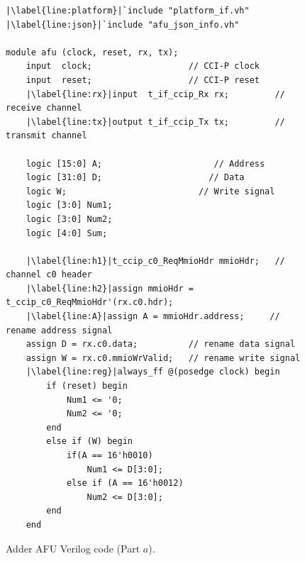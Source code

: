 \documentclass[11pt, twoside, pdftex]{article}
\begin{document}
\begin{figure}[h]
\begin{center}
\begin{minipage}[h]{16 cm}
\begin{lstlisting}[name=AFU]
|\label{line:platform}|`include "platform_if.vh"
|\label{line:json}|`include "afu_json_info.vh"

module afu (clock, reset, rx, tx);
    input  clock;                   // CCI-P clock
    input  reset;                   // CCI-P reset
    |\label{line:rx}|input  t_if_ccip_Rx rx;         // receive channel
    |\label{line:tx}|output t_if_ccip_Tx tx;         // transmit channel
    
    logic [15:0] A;                      // Address
    logic [31:0] D;                     // Data
    logic W;                          // Write signal
    logic [3:0] Num1;
    logic [3:0] Num2;
    logic [4:0] Sum;

    |\label{line:h1}|t_ccip_c0_ReqMmioHdr mmioHdr;   // channel c0 header
    |\label{line:h2}|assign mmioHdr = t_ccip_c0_ReqMmioHdr'(rx.c0.hdr);
    |\label{line:A}|assign A = mmioHdr.address;     // rename address signal
    assign D = rx.c0.data;          // rename data signal
    assign W = rx.c0.mmioWrValid;   // rename write signal
    |\label{line:reg}|always_ff @(posedge clock) begin
        if (reset) begin
            Num1 <= '0;
            Num2 <= '0;
        end
        else if (W) begin
            if(A == 16'h0010)
                Num1 <= D[3:0];
            else if (A == 16'h0012)
                Num2 <= D[3:0];
        end
    end

\end{lstlisting}
\end{minipage}
\caption{Adder AFU Verilog code (Part $a$).}
\label{fig:MMIO_code}
\end{center}
\end{figure}
\end{document}
